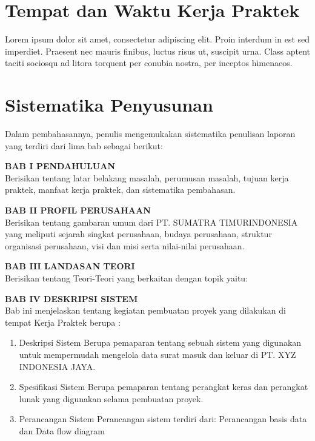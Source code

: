 \section{Tempat dan Waktu Kerja Praktek}

Lorem ipsum dolor sit amet, consectetur adipiscing elit. Proin interdum in est sed imperdiet. Praesent nec mauris finibus, luctus risus ut, suscipit urna. Class aptent taciti sociosqu ad litora torquent per conubia nostra, per inceptos himenaeos.

\section{Sistematika Penyusunan}

Dalam pembahasannya, penulis mengemukakan sistematika penulisan laporan yang terdiri dari lima bab sebagai berikut:

\vspace{0.5cm}
\noindent \textbf{BAB I PENDAHULUAN} \\
Berisikan tentang latar belakang masalah, perumusan masalah, tujuan kerja praktek, manfaat kerja praktek, dan sistematika pembahasan.

\vspace{0.5cm}
\noindent \textbf{BAB II PROFIL PERUSAHAAN} \\
Berisikan tentang gambaran umum dari PT. SUMATRA TIMURINDONESIA yang meliputi sejarah singkat perusahaan, budaya perusahaan, struktur organisasi perusahaan, visi dan misi serta nilai-nilai perusahaan.

\vspace{0.5cm}
\noindent \textbf{BAB III LANDASAN TEORI} \\
Berisikan tentang Teori-Teori yang berkaitan dengan topik yaitu:

\vspace{0.5cm}
\noindent \textbf{BAB IV DESKRIPSI SISTEM} \\
Bab ini menjelaskan tentang kegiatan pembuatan proyek yang dilakukan di tempat Kerja Praktek berupa :
\begin{enumerate}
      \item Deskripsi Sistem Berupa pemaparan tentang sebuah sistem yang digunakan untuk mempermudah mengelola data surat masuk dan keluar di PT. XYZ INDONESIA JAYA.
      \item Spesifikasi Sistem Berupa pemaparan tentang perangkat keras dan perangkat lunak yang digunakan selama pembuatan proyek.
      \item Perancangan Sistem Perancangan sistem terdiri dari: Perancangan basis data dan Data flow diagram
\end{enumerate}

